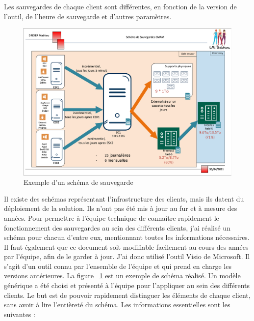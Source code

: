 \documentclass[pfe]{tnreport} %
\begin{document}
Les sauvegardes de chaque client sont différentes, en fonction de la version de l'outil, de l'heure de sauvegarde et d'autres paramètres. \newline
\begin{figure}[ht]
 \centering
 \includegraphics[width=18cm]{figures/schemaclient.pdf}
 \caption{Exemple d'un schéma de sauvegarde}
 \label{fig:schemaclient}
\end{figure}
Il existe des schémas représentant l'infrastructure des clients, mais ils datent du déploiement de la solution. Ils n'ont pas été mis à jour au fur et à mesure des années. \newline
Pour permettre à l'équipe technique de connaître rapidement le fonctionnement des sauvegardes au sein des différents clients, j'ai réalisé un schéma pour chacun d'entre eux, mentionnant toutes les informations nécessaires. \newline
Il faut également que ce document soit modifiable facilement au cours des années par l'équipe, afin de le garder à jour. \newline
J'ai donc utilisé l'outil Visio de Microsoft. Il s'agit d'un outil connu par l'ensemble de l'équipe et qui prend en charge les versions antérieures. \newline
La figure ~\ref{fig:schemaclient} est un exemple de schéma réalisé. \newline
Un modèle générique a été choisi et présenté à l'équipe pour l'appliquer au sein des différents clients. \newline
Le but est de pouvoir rapidement distinguer les éléments de chaque client, sans avoir à lire l'entièreté du schéma. \newpage
Les informations essentielles sont les suivantes : \newline
\end{document}
